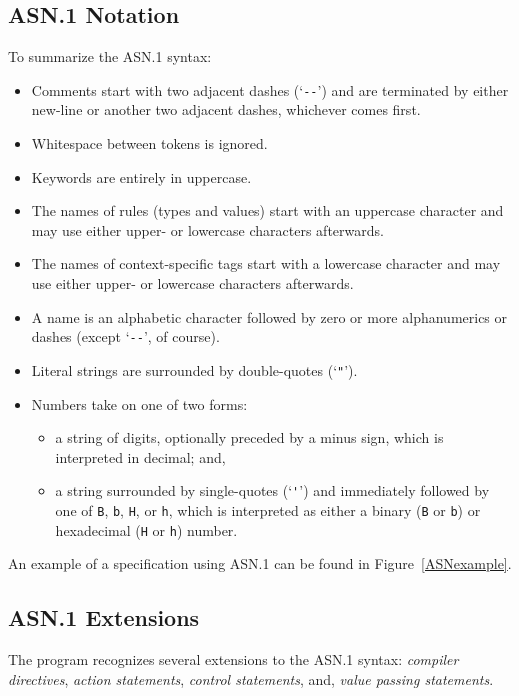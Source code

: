 \subsection	{ASN.1 Notation}\label{asn1:notation}
To summarize the ASN.1 syntax:
\begin{itemize}
\item	Comments start with two adjacent dashes (`\verb"--"') and are
terminated by either new-line or another two adjacent dashes,
whichever comes first.

\item	Whitespace between tokens is ignored.

\item	Keywords are entirely in uppercase.

\item	The names of rules (types and values) start with an uppercase
character and may use either upper- or lowercase characters afterwards.

\item	The names of context-specific tags start with a lowercase character
and may use either upper- or lowercase characters afterwards.

\item	A name is an alphabetic character followed by zero or more
alphanumerics or dashes (except `\verb"--"', of course).

\item	Literal strings are surrounded by double-quotes (`\verb|"|').

\item	Numbers take on one of two forms:
    \begin{itemize}
    \item	a string of digits, optionally preceded by a minus sign,
		which is interpreted in decimal;
		and,
    \item	a string surrounded by single-quotes (`\verb"'"') and
		immediately followed by one of \verb"B",  \verb"b",
		\verb"H", or \verb"h", which is interpreted as either
		a binary (\verb"B" or \verb"b") or hexadecimal (\verb"H"
		or \verb"h") number.
    \end{itemize}
\end{itemize}

An example of a specification using ASN.1 can be found in
Figure~\ref{ASNexample}.
{\let\small=\scriptsize			%
}

\subsection	{ASN.1 Extensions}
The  program recognizes several extensions to the ASN.1 syntax:
{\em compiler directives}, {\em action statements},
{\em control statements}, and, {\em value passing statements}.

